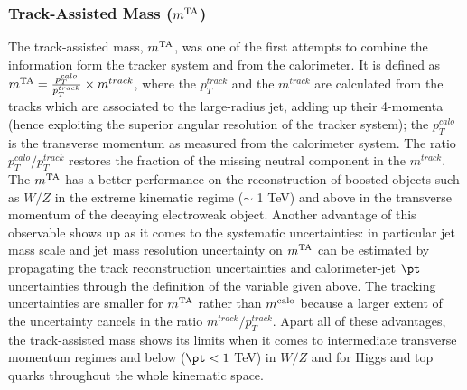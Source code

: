 \subsubsection{Track-Assisted Mass ($m^\textrm{TA}$)}
The track-assisted mass, $m^\textrm{TA}$, was one of the first attempts to combine the information form the tracker system and from the calorimeter. It is defined as $m^\textrm{TA}=\frac{p_T^{calo}}{p_T^{track}}\times m^{track}$, where the $p_T^{track}$ and the $m^{track}$ are calculated from the tracks which are associated to the large-radius jet, adding up their 4-momenta (hence exploiting the superior angular resolution of the tracker system); the $p_T^{calo}$ is the transverse momentum as measured from the calorimeter system. The ratio $p_T^{calo}/p_T^{track}$ restores the fraction of the missing neutral component in the $m^{track}$.
The $m^\textrm{TA}$ has a better performance on the reconstruction of boosted objects such as $W/Z$ in the extreme kinematic regime ($\sim $ 1 TeV) and above in the transverse momentum of the decaying electroweak object. Another advantage of this observable shows up as it comes to the systematic uncertainties: in particular jet mass scale and jet mass resolution uncertainty on $m^\textrm{TA}$ can be estimated by propagating the track reconstruction uncertainties and calorimeter-jet $\pt$ uncertainties through the definition of the variable given above. The tracking uncertainties are smaller for $m^\textrm{TA}$ rather than $m^\textrm{calo}$ because a larger extent of the uncertainty cancels in the ratio $m^{track}/p_T^{track}$.
Apart all of these advantages, the track-assisted mass shows its limits when it comes to intermediate transverse momentum regimes and below ($\pt < 1 $ TeV) in $W/Z$ and for Higgs and top quarks throughout the whole kinematic space.
